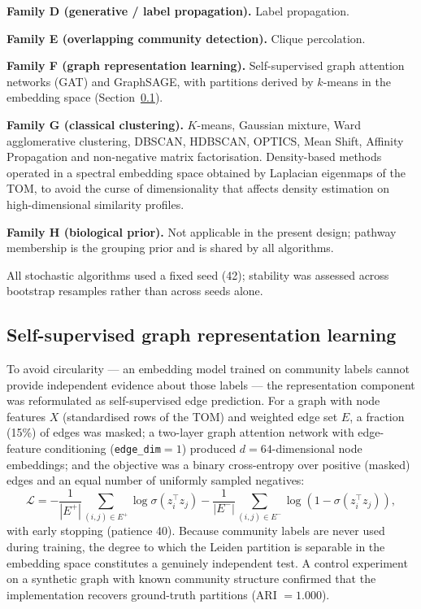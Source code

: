 \documentclass[twocolumn,11pt]{article}
\begin{document}
\noindent\textbf{Family D (generative / label propagation).} Label propagation.

\noindent\textbf{Family E (overlapping community detection).} Clique percolation.

\noindent\textbf{Family F (graph representation learning).} Self-supervised graph attention
networks (GAT) and GraphSAGE, with partitions derived by $k$-means in the embedding space
(Section~\ref{sec:selfsup}).

\noindent\textbf{Family G (classical clustering).} $K$-means, Gaussian mixture, Ward
agglomerative clustering, DBSCAN, HDBSCAN, OPTICS, Mean Shift, Affinity Propagation and
non-negative matrix factorisation. Density-based methods operated in a spectral embedding
space obtained by Laplacian eigenmaps of the TOM, to avoid the curse of dimensionality
that affects density estimation on high-dimensional similarity profiles.

\noindent\textbf{Family H (biological prior).} Not applicable in the present design;
pathway membership is the grouping prior and is shared by all algorithms.

All stochastic algorithms used a fixed seed (42); stability was assessed across bootstrap
resamples rather than across seeds alone.

\subsection{Self-supervised graph representation learning}
\label{sec:selfsup}

To avoid circularity --- an embedding model trained on community labels cannot provide
independent evidence about those labels --- the representation component was reformulated
as self-supervised edge prediction. For a graph with node features $X$ (standardised rows of
the TOM) and weighted edge set $E$, a fraction (15\%) of edges was masked; a two-layer
graph attention network with edge-feature conditioning (\texttt{edge\_dim}$=1$) produced
$d = 64$-dimensional node embeddings; and the objective was a binary cross-entropy over
positive (masked) edges and an equal number of uniformly sampled negatives:
\begin{equation}
\mathcal{L} = -\frac{1}{|E^{+}|}\sum_{(i,j)\in E^{+}}\log\sigma(z_i^{\top}z_j)
-\frac{1}{|E^{-}|}\sum_{(i,j)\in E^{-}}\log\!\left(1-\sigma(z_i^{\top}z_j)\right),
\end{equation}
with early stopping (patience 40). Because community labels are never used during training,
the degree to which the Leiden partition is separable in the embedding space constitutes a
genuinely independent test. A control experiment on a synthetic graph with known community
structure confirmed that the implementation recovers ground-truth partitions (ARI $=1.000$).
\end{document}
